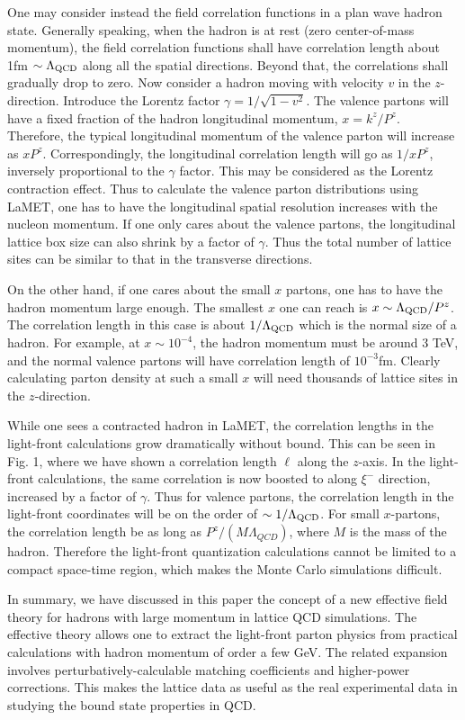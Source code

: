 One may consider instead the field correlation functions in a plan wave
hadron state. Generally speaking, when the hadron is at rest (zero center-of-mass momentum),
the field correlation functions shall have correlation length about 1fm $\sim \Lambda_{\rm QCD}$
along all the spatial directions. Beyond that, the correlations shall gradually drop to zero.
Now consider a hadron moving with velocity $v$ in the $z$-direction. Introduce the Lorentz factor $\gamma=
1/\sqrt{1-v^2}$. The valence partons will have a fixed fraction of the hadron
longitudinal momentum, $x=k^z/P^z$. Therefore, the typical longitudinal momentum of the valence
parton will increase as $xP^z$. Correspondingly, the longitudinal correlation length will go as
$1/xP^z$, inversely proportional to the $\gamma$ factor. This may be considered as the Lorentz
contraction effect. Thus to calculate the valence parton distributions using LaMET, one has to
have the longitudinal spatial resolution increases with the nucleon momentum. If one only cares
about the valence partons, the longitudinal lattice box size can also shrink by a factor of
$\gamma$. Thus the total number of lattice sites can be similar to that in the transverse directions.

On the other hand, if one cares about the small $x$ partons, one has to have the hadron momentum
large enough. The smallest $x$ one can reach is $x\sim \Lambda_{\rm QCD}/P^z$. The correlation length
in this case is about $ 1/\Lambda_{\rm QCD}$ which is the normal size of a hadron. For example, at $
x\sim 10^{-4}$, the hadron momentum must be around 3 TeV, and the normal valence partons will have
correlation length of $10^{-3}$fm. Clearly calculating parton density at such a small $x$ will need
thousands of lattice sites in the $z$-direction.

While one sees a contracted hadron in LaMET, the correlation lengths in the light-front calculations
grow dramatically without bound. This can be seen in Fig. 1, where we have shown a correlation length
$\ell$ along the $z$-axis. In the light-front calculations, the same correlation is now boosted
to along $\xi^-$ direction, increased by a factor of $\gamma$. Thus for valence partons, the correlation length
in the light-front coordinates will be on the order of $\sim 1/\Lambda_{\rm QCD}$.
For small $x$-partons, the correlation length be as long as $P^z/(M\Lambda_{QCD})$, where $M$ is the mass of
the hadron. Therefore the light-front quantization calculations cannot be limited to a compact space-time
region, which makes the Monte Carlo simulations difficult.

In summary, we have discussed in this paper the concept of a new effective field theory
for hadrons with large momentum in lattice QCD simulations. The effective theory allows one
to extract the light-front parton physics from practical calculations with hadron momentum
of order a few GeV. The related expansion involves perturbatively-calculable matching coefficients
and higher-power corrections. This makes the lattice data as useful as the real experimental
data in studying the bound state properties in QCD.
